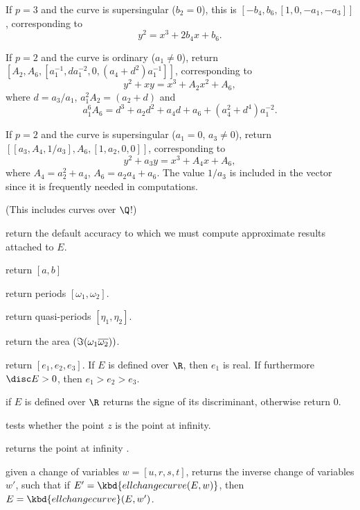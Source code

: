 \item If $p = 3$ and the curve is supersingular ($b_2 = 0$), this is
$[-b_4, b_6, [1,0,-a_1,-a_3]]$, corresponding to
$$y^2 = x^3 + 2b_4 x + b_6.$$

\item If $p = 2$ and the curve is ordinary ($a_1 \neq 0$), return
$[A_2,A_6,[a_1^{-1}, da_1^{-2}, 0, (a_4+d^2)a_1^{-1}]]$, corresponding to
$$ y^2 + xy = x^3 + A_2 x^2 + A_6,$$
where
$d = a_3/a_1$, $a_1^2 A_2 = (a_2 + d)$ and
$$ a_1^6 A_6 = d^3 + a_2 d^2 + a_4 d + a_6 + (a_4^2 + d^4)a_1^{-2}.$$

\item If $p = 2$ and the curve is supersingular ($a_1 = 0$, $a_3\neq 0$), return
$[[a_3, A_4, 1/a_3], A_6, [1,a_2,0,0]]$, corresponding to
$$ y^2 + a_3 y = x^3 + A_4 x + A_6,$$
where $A_4 = a_2^2 + a_4$, $ A_6 = a_2a_4 + a_6$. The value $1/a_3$ is
included in the vector since it is frequently needed in computations.

 (This includes curves over $\Q$!)

 return the default accuracy to
which we must compute approximate results attached to $E$.

 return $[a,b]$

 return periods
$[\omega_1,\omega_2]$.

 return quasi-periods
$[\eta_1,\eta_2]$.

 return the area
$(\Im(\omega_1\*\overline{\omega_2}))$.

 return $[e_1,e_2,e_3]$. If $E$ is
defined over $\R$, then $e_1$ is real. If furthermore $\disc E > 0$, then
$e_1 > e_2 > e_3$.

 if $E$ is defined over $\R$ returns the
signe of its discriminant, otherwise return $0$.


 tests whether the point $z$ is the point at
infinity.

 returns the point at infinity \kbd{[0]}.


 given a change of variables $w =
[u,r,s,t]$, returns the inverse change of variables $w'$, such that if $E' =
\kbd{ellchangecurve(E, w)}$, then $E = \kbd{ellchangecurve}(E, w')$.


